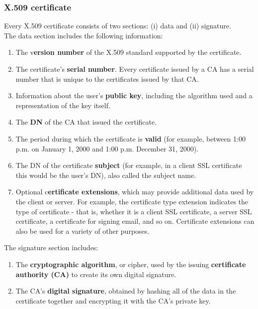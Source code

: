 \documentclass[10pt]{article}
\begin{document}
\subsubsection{X.509 certificate}
Every X.509 certificate consists of two sections: (i) data and (ii) signature. \\
The data section includes the following information:
\begin{enumerate}
	\item The v\textbf{ersion number} of the X.509 standard supported by the certificate.
	\item The certificate's \textbf{serial number}. Every certificate issued by a CA has a serial number that is unique to the certificates issued by that CA.
	\item Information about the user's \textbf{public key}, including the algorithm used and a representation of the key itself.
	\item The \textbf{DN} of the CA that issued the certificate.
	\item The period during which the certificate is \textbf{valid} (for example, between 1:00 p.m. on January 1, 2000 and 1:00 p.m. December 31, 2000).
	\item The DN of the certificate \textbf{subject} (for example, in a client SSL certificate this would be the user's DN), also called the subject name.
	\item Optional c\textbf{ertificate extensions}, which may provide additional data used by the client or server. For example, the certificate type extension indicates the type of certificate - that is, whether it is a client SSL certificate, a server SSL certificate, a certificate for signing email, and so on. Certificate extensions can also be used for a variety of other purposes.
\end{enumerate}
The signature section includes:
\begin{enumerate}
	\item The \textbf{cryptographic algorithm}, or cipher, used by the issuing \textbf{certificate authority (CA)} to create its own digital signature.
	\item The CA's \textbf{digital signature}, obtained by hashing all of the data in the certificate together and encrypting it with the CA's private key.
\end{enumerate}
\end{document}
